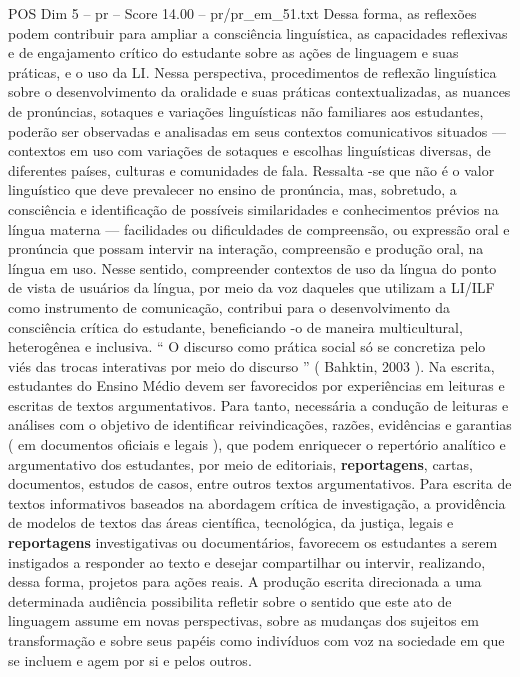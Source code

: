 \begin{textsample}{POS Dim 5 – pr – Score 14.00 – pr/pr\_em\_51.txt}
Dessa forma, as reflexões podem contribuir para ampliar a consciência linguística, as capacidades reflexivas e de engajamento crítico do estudante sobre as ações de linguagem e suas práticas, e o uso da LI.
Nessa perspectiva, procedimentos de reflexão linguística sobre o desenvolvimento da oralidade e suas práticas contextualizadas, as nuances de pronúncias, sotaques e variações linguísticas não familiares aos estudantes, poderão ser observadas e analisadas em seus contextos comunicativos situados — contextos em uso com variações de sotaques e escolhas linguísticas diversas, de diferentes países, culturas e comunidades de fala.
Ressalta -se que não é o valor linguístico que deve prevalecer no ensino de pronúncia, mas, sobretudo, a consciência e identificação de possíveis similaridades e conhecimentos prévios na língua materna — facilidades ou dificuldades de compreensão, ou expressão oral e pronúncia que possam intervir na interação, compreensão e produção oral, na língua em uso.
Nesse sentido, compreender contextos de uso da língua do ponto de vista de usuários da língua, por meio da voz daqueles que utilizam a LI/ILF como instrumento de comunicação, contribui para o desenvolvimento da consciência crítica do estudante, beneficiando -o de maneira multicultural, heterogênea e inclusiva. “ O discurso como prática social só se concretiza pelo viés das trocas interativas por meio do discurso ” ( Bahktin, 2003 ).
Na escrita, estudantes do Ensino Médio devem ser favorecidos por experiências em leituras e escritas de textos argumentativos.
Para tanto, necessária a condução de leituras e análises com o objetivo de identificar reivindicações, razões, evidências e garantias ( em documentos oficiais e legais ), que podem enriquecer o repertório analítico e argumentativo dos estudantes, por meio de editoriais, \textbf{reportagens}, cartas, documentos, estudos de casos, entre outros textos argumentativos.
Para escrita de textos informativos baseados na abordagem crítica de investigação, a providência de modelos de textos das áreas científica, tecnológica, da justiça, legais e \textbf{reportagens} investigativas ou documentários, favorecem os estudantes a serem instigados a responder ao texto e desejar compartilhar ou intervir, realizando, dessa forma, projetos para ações reais.
A produção escrita direcionada a uma determinada audiência possibilita refletir sobre o sentido que este ato de linguagem assume em novas perspectivas, sobre as mudanças dos sujeitos em transformação e sobre seus papéis como indivíduos com voz na sociedade em que se incluem e agem por si e pelos outros.

\end{textsample}

